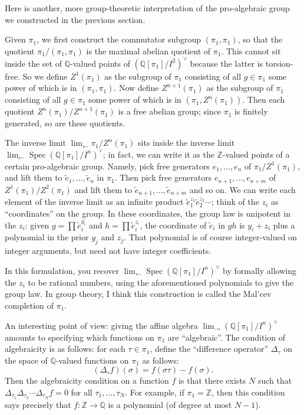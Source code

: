 \documentclass[12pt]{article}
\def\QQ{\mathbb{Q}}
\def\ZZ{\mathbb{Z}}
\def\dual{\vee}
\DeclareMathOperator{\Spec}{Spec}
\begin{document}
Here is another, more group-theoretic interpretation of the pro-algebraic group
we constructed in the previous section.

Given $\pi_1$, we first construct the commutator subgroup $(\pi_1, \pi_1)$,
so that the quotient $\pi_1/(\pi_1,\pi_1)$ is the maximal abelian
quotient of $\pi_1$. This cannot sit inside the set of $\QQ$-valued points of
$(\QQ[\pi_1]/I^2)^\dual$ because the latter is torsion-free. So we
define $Z^1(\pi_1)$ as the subgroup of $\pi_1$ consisting of all $g
\in \pi_1$ some power of which is in $(\pi_1, \pi_1)$. Now define
$Z^{n+1}(\pi_1)$ as the subgroup of $\pi_1$ consisting of all
$g \in \pi_1$ some power of which is in $(\pi_1, Z^n(\pi_1))$. Then
each quotient $Z^n(\pi_1)/Z^{n+1}(\pi_1)$ is a free abelian group;
since $\pi_1$ is finitely generated, so are these quotients.

The inverse limit $\lim_{\leftarrow} \pi_1/Z^n(\pi_1)$ sits inside
the inverse limit $\lim_{\leftarrow} \Spec (\QQ[\pi_1]/I^n)^\dual$;
in fact, we can write it as the $\ZZ$-valued points of a certain
pro-algebraic group. Namely, pick free generators $e_1, \dots, e_n$
of $\pi_1/Z^1(\pi_1)$, and lift them to $\tilde{e}_1, \dots,
\tilde{e}_n$ in $\pi_1$. Then pick free generators $e_{n+1}, \dots, e_{n+m}$
of $Z^1(\pi_1)/Z^2(\pi_1)$ and lift them to $\tilde{e}_{n+1},
\dots, \tilde{e}_{n+m}$ and so on. We can write each element of the
inverse limit as an infinite product $\tilde{e}_1^{z_1} \tilde{e}_2^{z_2}
\cdots$; think of the $z_i$ as ``coordinates'' on the group.
In these coordinates, the group law is unipotent in the $z_i$: given
$g = \prod \tilde{e}_i^{y_i}$ and $h = \prod \tilde{e}_i^{z_i}$, the
coordinate of $\tilde{e}_i$ in $gh$ is $y_i+z_i$ plus a polynomial in
the prior $y_j$ and $z_j$. That polynomial is of course integer-valued
on integer arguments, but need not have integer coefficients.

In this formulation, you recover 
$\lim_{\leftarrow} \Spec (\QQ[\pi_1]/I^n)^\dual$
by formally allowing the $z_i$ to be rational numbers, using the
aforementioned polynomials to give the group law. In group theory, I think
this construction is called the Mal'cev completion of $\pi_1$.

An interesting point of view: giving the affine algebra 
$\lim_{\rightarrow} (\QQ[\pi_1]/I^n)^\dual$ amounts to specifying
which functions on $\pi_1$ are ``algebraic''. The condition of algebraicity
is as follows: for each $\tau \in \pi_1$, define the ``difference operator''
$\Delta_\tau$
on the space of $\QQ$-valued functions on $\pi_1$ as follows:
\[
(\Delta_\tau f)(\sigma) = f(\sigma \tau) - f(\sigma).
\]
Then the algebraicity condition on a function $f$ is that there exists $N$
such that $\Delta_{\tau_1} \Delta_{\tau_2}\cdots \Delta_{\tau_N} f = 0$
for all $\tau_1, \dots, \tau_N$. For example, if $\pi_1 = \ZZ$, then this
condition says precisely that $f: \ZZ \to \QQ$ is a polynomial
(of degree at most $N-1$).
\end{document}
